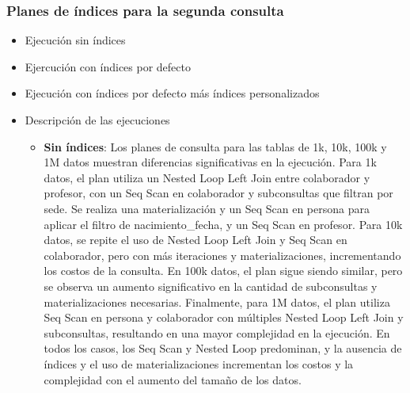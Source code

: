 \subsubsection{Planes de índices para la segunda consulta}
\begin{itemize}
      \item{Ejecución sin índices}
      \item{Ejercución con índices por defecto}
      \item{Ejecución con índices por defecto más índices personalizados}
      \item{Descripción de las ejecuciones}
      \begin{itemize}
            \item {\textbf{Sin índices}: Los planes de consulta para las tablas de 1k, 10k, 100k y 1M datos muestran diferencias significativas en la ejecución. Para 1k datos, el plan utiliza un Nested Loop Left Join entre colaborador y profesor, con un Seq Scan en colaborador y subconsultas que filtran por sede. Se realiza una materialización y un Seq Scan en persona para aplicar el filtro de nacimiento\_fecha, y un Seq Scan en profesor. Para 10k datos, se repite el uso de Nested Loop Left Join y Seq Scan en colaborador, pero con más iteraciones y materializaciones, incrementando los costos de la consulta. En 100k datos, el plan sigue siendo similar, pero se observa un aumento significativo en la cantidad de subconsultas y materializaciones necesarias. Finalmente, para 1M datos, el plan utiliza Seq Scan en persona y colaborador con múltiples Nested Loop Left Join y subconsultas, resultando en una mayor complejidad en la ejecución. En todos los casos, los Seq Scan y Nested Loop predominan, y la ausencia de índices y el uso de materializaciones incrementan los costos y la complejidad con el aumento del tamaño de los datos.}

\end{itemize}
\end{itemize}
